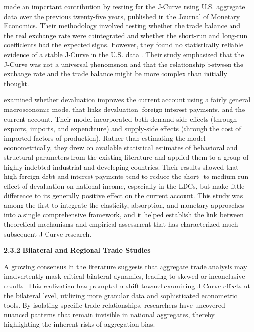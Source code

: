 \documentclass[12pt]{article}
\begin{document}
\textcite{Rose1989-bs} made an important contribution by testing for the J-Curve using U.S. aggregate data over the previous twenty-five years, published in the Journal of Monetary Economics. Their methodology involved testing whether the trade balance and the real exchange rate were cointegrated and whether the short-run and long-run coefficients had the expected signs. However, they found no statistically reliable evidence of a stable J-Curve in the U.S. data . Their study emphasized that the J-Curve was not a universal phenomenon and that the relationship between the exchange rate and the trade balance might be more complex than initially thought.

\textcite{Gylfason1984-ys} examined whether devaluation improves the current account using a fairly general macroeconomic model that links devaluation, foreign interest payments, and the current account. Their model incorporated both demand-side effects (through exports, imports, and expenditure) and supply-side effects (through the cost of imported factors of production). Rather than estimating the model econometrically, they drew on available statistical estimates of behavioral and structural parameters from the existing literature and applied them to a group of highly indebted industrial and developing countries. Their results showed that high foreign debt and interest payments tend to reduce the short- to medium-run effect of devaluation on national income, especially in the LDCs, but make little difference to its generally positive effect on the current account. This study was among the first to integrate the elasticity, absorption, and monetary approaches into a single comprehensive framework, and it helped establish the link between theoretical mechanisms and empirical assessment that has characterized much subsequent J-Curve research.

\vspace{0.5cm}
\noindent\textbf{2.3.2 Bilateral and Regional Trade Studies}

A growing consensus in the literature suggests that aggregate trade analysis may inadvertently mask critical bilateral dynamics, leading to skewed or inconclusive results. This realization has prompted a shift toward examining J-Curve effects at the bilateral level, utilizing more granular data and sophisticated econometric tools. By isolating specific trade relationships, researchers have uncovered nuanced patterns that remain invisible in national aggregates, thereby highlighting the inherent risks of aggregation bias.
\end{document}
